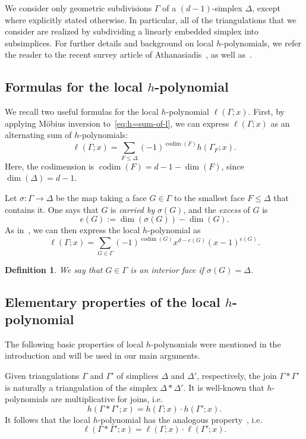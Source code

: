 \documentclass[10pt]{amsart}
\newtheorem{defi}[theorem]{Definition}
\DeclareMathOperator{\codim}{codim}
\newcommand{\ie}{i.e.\ }
\begin{document}
We consider only geometric subdivisions $\Gamma$ of a $(d-1)$-simplex $\Delta$, except where explicitly stated otherwise. In particular, all of the triangulations that we consider are realized by subdividing a linearly embedded simplex into subsimplices. For further details and background on local $h$-polynomials, we refer the reader to the recent survey article of Athanasiadis~\cite{Athanasiadis16}, as well as~\cite{Stanley92}.

\subsection{Formulas for the local \texorpdfstring{$h$}{h}-polynomial}
We recall two useful formulas for the local $h$-polynomial $\ell(\Gamma;x)$. First, by applying M{\"o}bius inversion to~\eqref{eq:h=sum-of-l}, we can express $\ell(\Gamma;x)$ as an alternating sum of $h$-polynomials:
\begin{equation} \label{eq:alternating sum}
\ell(\Gamma;x) = \sum_{F \leq \Delta}(-1)^{\codim (F)} h(\Gamma_F;x).
\end{equation}
Here, the codimension is $\codim(F) = d - 1 - \dim(F)$, since $\dim(\Delta) = d-1$.

Let $\sigma: \Gamma \rightarrow \Delta$ be the map taking a face $G \in \Gamma$ to the smallest face $F \leq \Delta$ that contains it. One says that $G$ is \emph{carried by} $\sigma(G)$, and the \emph{excess} of $G$ is
\[
e(G) := \dim (\sigma(G)) - \dim (G).
\]
As in~\cite[Prop. 2.2]{Stanley92}, we can then express the local $h$-polynomial as
\begin{equation}\label{eq:excess formula}
\ell(\Gamma; x) = \sum_{G \in \Gamma} (-1)^{\codim(G)} x^{d- e(G)} (x-1)^{e(G)}.
\end{equation}

\begin{defi}
We say that $G \in \Gamma$ is an \emph{interior face} if $\sigma(G) = \Delta$. 
\end{defi}


\subsection{Elementary properties of the local \texorpdfstring{$h$}{h}-polynomial}

The following basic properties of local $h$-polynomials were mentioned in the introduction and will be used in our main arguments.

Given triangulations $\Gamma$ and $\Gamma'$ of simplices $\Delta$ and $\Delta'$, respectively, the join $\Gamma * \Gamma'$ is naturally a triangulation of the simplex $\Delta * \Delta'$. It is well-known that $h$-polynomials are multiplicative for joins, \ie
\[
h(\Gamma*\Gamma';x) = h(\Gamma;x)\cdot h(\Gamma';x).
\]
It follows that the local $h$-polynomial has the analogous property~\cite[Lemma~2.2]{AthanasiadisSavvidou12}, \ie
\begin{equation} \label{eq:join}
\ell(\Gamma*\Gamma';x) = \ell(\Gamma;x) \cdot \ell(\Gamma';x).
\end{equation}
\end{document}
